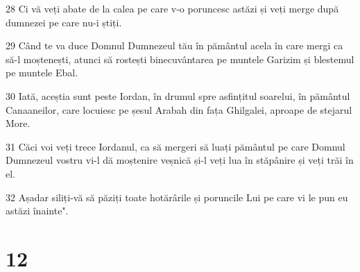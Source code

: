 \par 28 Ci vă veți abate de la calea pe care v-o poruncesc astăzi și veți merge după dumnezei pe care nu-i știți.
\par 29 Când te va duce Domnul Dumnezeul tău în pământul acela în care mergi ca să-l moștenești, atunci să rostești binecuvântarea pe muntele Garizim și blestemul pe muntele Ebal.
\par 30 Iată, aceștia sunt peste Iordan, în drumul spre asfințitul soarelui, în pământul Canaaneilor, care locuiesc pe șesul Arabah din fața Ghilgalei, aproape de stejarul More.
\par 31 Căci voi veți trece Iordanul, ca să mergeri să luați pământul pe care Domnul Dumnezeul vostru vi-l dă moștenire veșnică și-l veți lua în stăpânire și veți trăi în el.
\par 32 Așadar siliți-vă să păziți toate hotărârile și poruncile Lui pe care vi le pun eu astăzi înainte".

\chapter{12}

